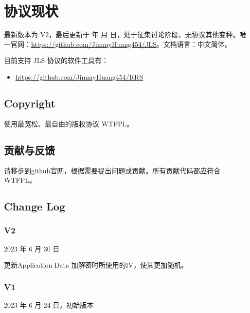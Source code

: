 \renewcommand{\today}{\number\year 年 \number\month 月 \number\day 日}

\chapter{协议现状}

最新版本为 V2，最后更新于 \today，处于征集讨论阶段，无协议其他变种。唯一官网：\href{https://github.com/JimmyHuang454/JLS}{https://github.com/JimmyHuang454/JLS}。文档语言：中文简体。

目前支持 JLS 协议的软件工具有：
\begin{itemize}
	\item \href{https://github.com/JimmyHuang454/RRS}{https://github.com/JimmyHuang454/RRS}
\end{itemize}



\section{Copyright}
使用最宽松、最自由的版权协议 WTFPL。

\section{贡献与反馈}
请移步到github官网，根据需要提出问题或贡献。所有贡献代码都应符合 WTFPL。

\section{Change Log}
\subsection{V2}
2023 年 6 月 30 日

更新Application Data 加解密时所使用的IV，使其更加随机。


\subsection{V1}
2023 年 6 月 24 日，初始版本

